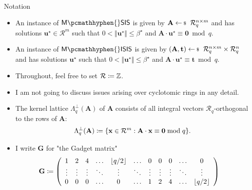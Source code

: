\documentclass[xcolor=table,10pt,aspectratio=169]{beamer}
\renewcommand{\vec}[1]{\ensuremath{\mathbf{#1}}\xspace}
\providecommand{\mat}[1]{\ensuremath{\vec{#1}}\xspace}
\providecommand{\ring}[0]{\ensuremath{\mathcal{R}}\xspace}
\newcommand{\MSIS}{\ensuremath{\mathsf{M}\pcmathhyphen{}\mathsf{SIS}}\xspace}
\newcommand{\MISIS}{\ensuremath{\mathsf{M}\pcmathhyphen{}\mathsf{ISIS}}\xspace}
\begin{document}
\begin{frame}[allowframebreaks]{Notation}
\begin{definition}[M-(I)SIS]
\begin{itemize}
\item An instance of \(\MSIS\) is given by \(\mat{A} \sample \ring_q^{n\times m}\) and has solutions \(\vec{u}^{\star} \in \ring^{m}\) such that \(0 < \Vert\vec{u}^{\star} \Vert \leq \beta^{\star}\) and \(\mat{A} \cdot \vec{u}^{\star} \equiv \vec{0} \bmod q\).
\item An instance of \(\MISIS\) is given by \((\mat{A}, \vec{t}) \sample \ring_q^{n\times m} \times \ring_q^n\) and has solutions \(\vec{u}^{\star}\) such that \(0 < \Vert \vec{u}^{\star} \Vert \leq \beta^{\star}\) and \(\mat{A} \cdot \vec{u}^{\star} \equiv \vec{t} \bmod q\).
\end{itemize}
\label{def:sis}
\end{definition}

\begin{itemize}
\item Throughout, feel free to set \(\ring \coloneqq \ZZ\).
\item I am not going to discuss issues arising over cyclotomic rings in any detail.
\end{itemize}

\framebreak

\begin{itemize}
\item The kernel lattice \(\Lambda_q^\bot(\mat{A})\) of \(\mat{A}\) consists of all integral vectors \(\ring_q\)-orthogonal to the rows of \(\mat{A}\):
\[\Lambda_q^\bot(\mat{A}) \coloneqq \set{ \vec{x} \in \ring^m : \mat{A} \cdot \vec{x} \equiv \vec{0} \bmod q }.\]
\item I write \(\mat{G}\) for "the Gadget matrix"
\begin{align*}
\mat{G} &\coloneqq
\left(\begin{array}{*{20}c}
1 & 2 & 4 & \ldots & \lfloor q/2 \rfloor & \ldots & 0 & 0 & 0 & \ldots & 0 \\
\vdots & \vdots & \vdots & \ddots & \vdots       & \ddots & \vdots & \vdots & \vdots & \ddots & \vdots \\
0 & 0 & 0  & \ldots& 0       & \ldots & 1 & 2 & 4 & \ldots & \lfloor q/2 \rfloor \\
\end{array}\right)
\end{align*}
\end{itemize}
\end{frame}
\end{document}
